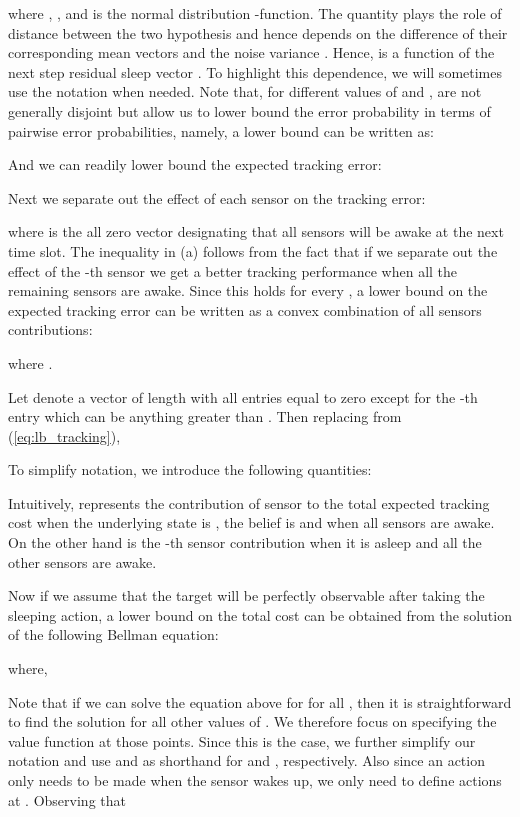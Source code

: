 \documentclass[journal,draftcls,onecolumn,11pt]{IEEEtran}
\begin{document}
where , , and  is the normal distribution -function. The quantity  plays the role of distance between the two hypothesis and hence depends on the difference of their corresponding mean vectors and the noise variance . Hence,  is a function of the next step residual sleep vector . To highlight this dependence, we will sometimes use the notation  when needed. Note that, for different values of  and ,  are not generally disjoint but allow us to lower bound the error probability in terms of pairwise error probabilities, namely, a lower bound can be written as:

And we can readily lower bound the expected tracking error:


Next we separate out the effect of each sensor on the tracking error:

where  is the all zero vector designating that all sensors will be awake at the next time slot. The inequality in
(a) follows from the fact that if we separate out the effect of the -th sensor we get a better tracking performance when all the remaining sensors are awake. Since this holds for every , a lower bound on the expected tracking error can be written as a convex combination of all sensors contributions:

where .

Let  denote a vector of length  with all entries equal to zero except for the -th entry which can be anything greater than . Then replacing from (\ref{eq:lb_tracking}),


To simplify notation, we introduce the following  quantities:



Intuitively,  represents the contribution of sensor  to the total expected tracking cost when the underlying state is , the belief is  and when all sensors are awake. On the other hand  is the -th sensor contribution when it is asleep and all the other sensors are awake.

Now if we assume that the target will be perfectly observable after taking the sleeping action, a lower bound on the total cost can be obtained from the solution of the following Bellman equation:

where,

Note that if we can solve the equation above for  for all , then it is straightforward to find the solution for all other values of . We therefore focus on specifying the value function at those points. Since this is the case, we further simplify our notation and use  and  as shorthand for  and , respectively. Also since an action only needs to be made when the sensor wakes up, we only need to define actions at . Observing that
\end{document}
